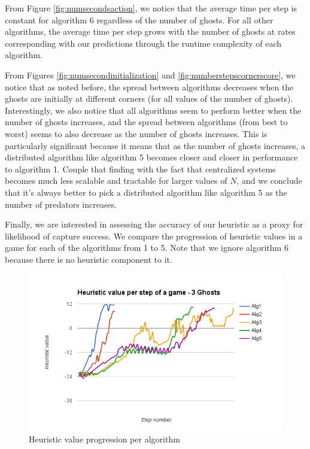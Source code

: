 \documentclass[11pt]{article}
\begin{document}
\begin{multicols}{2}

From Figure \ref{fig:numsecondsaction}, we notice that the average time per step is constant for algorithm 6 regardless of the number of ghosts. For all other algorithms, the average time per step grows with the number of ghosts at rates corresponding with our predictions through the runtime complexity of each algorithm.

From Figures \ref{fig:numsecondinitialization} and \ref{fig:numberstepscornerscore}, we notice that as noted before, the spread between algorithms decreases when the ghosts are initially at different corners (for all values of the number of ghosts). Interestingly, we also notice that all algorithms seem to perform better when the number of ghosts increases, and the spread between algorithms (from best to worst) seems to also decrease as the number of ghosts increases. This is particularly significant because it means that as the number of ghosts increases, a distributed algorithm like algorithm 5 becomes closer and closer in performance to algorithm 1. Couple that finding with the fact that centralized systems becomes much less scalable and tractable for larger values of $N$, and we conclude that it's always better to pick a distributed algorithm like algorithm 5 as the number of predators increases.

Finally, we are interested in assessing the accuracy of our heuristic as a proxy for likelihood of capture success. We compare the progression of heuristic values in a game for each of the algorithms from 1 to 5. Note that we ignore algorithm 6 because there is no heuristic component to it.\\
\begin{figure}[H]
	\includegraphics[scale=0.45]{heuristicvalues.png}
	\caption{Heuristic value progression per algorithm}
	\label{fig:heuristicvalueprogression}
\end{figure}


\end{multicols}
\end{document}
